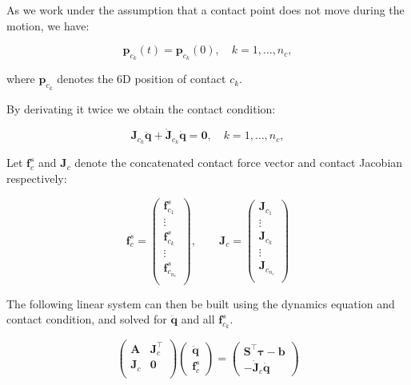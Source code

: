 As we work under the assumption that a contact point does not move
during the motion, we have:

\begin{equation}
\mathbf{p}_{c_k}(t)=\mathbf{p}_{c_k}(0),\quad k = 1,\ldots,n_c,
\end{equation}

\noindent where $\mathbf{p}_{c_k}$ denotes the 6D position of contact $c_k$.

By derivating it twice we obtain the contact condition:

\begin{equation}
\mathbf{J}_{c_k}\ddot{\mathbf{q}} +
\dot{\mathbf{J}}_{c_k}\dot{\mathbf{q}}=\mathbf{0}, \quad k = 1,\ldots,n_c,
\end{equation}

\noindent Let $\mathbf{f}^s_c$ and $\mathbf{J}_c$ denote the concatenated
contact force vector and contact Jacobian respectively:

\begin{equation}
\mathbf{f}^s_c=
\left(\begin{matrix}
\mathbf{f}^s_{c_1}\\
\vdots\\
\mathbf{f}^s_{c_k}\\
\vdots\\
\mathbf{f}^s_{c_{n_c}}\\
\end{matrix}\right),
\qquad
\mathbf{J}_c=
\left(\begin{matrix}
\mathbf{J}_{c_1}\\
\vdots\\
\mathbf{J}_{c_k}\\
\vdots\\
\mathbf{J}_{c_{n_c}}\\
\end{matrix}\right)
\end{equation}

\noindent The following linear system can then be built using the dynamics
equation and contact condition, and solved for $\ddot{\mathbf{q}}$ and
all $\mathbf{f}^s_{c_k}$.

\begin{equation}
  \left(\begin{matrix}
    \mathbf{A} & \mathbf{J}_{c}^\top \\
    \mathbf{J}_{c} & \mathbf{0}\\
  \end{matrix}\right)
  \left(\begin{matrix}
  \ddot{\mathbf{q}}\\
  \mathbf{f}^s_{c}
  \end{matrix}\right)
  = \left(\begin{matrix} \mathbf{S}^\top\boldsymbol{\tau}-\mathbf{b}
    \\ -\dot{\mathbf{J}}_{c}\dot{\mathbf{q}}
  \end{matrix}\right)
\end{equation}


